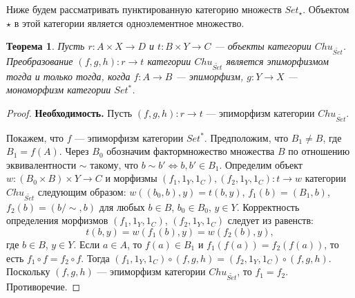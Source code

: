 \documentclass[a4paper,12pt]{article}
\newtheorem{theorem}{Теорема}
\begin{document}
Ниже будем рассматривать пунктированную категорию множеств $Set_\star$. Объектом $\star$ в этой категории является одноэлементное множество.
\begin{theorem}\label{epimorphism}
Пусть $r: A \times X \to D$ и $t: B \times Y \to C$ --- объекты категории $Chu_{\widetilde{Set}}$. Преобразование $(f,g,h): r \to t$ категории $Chu_{\widetilde{Set}}$ является эпиморфизмом тогда и только тогда, когда $f: A \to B$ --- эпиморфизм, $g: Y \to X$ --- мономорфизм категории $Set^*$.
\end{theorem}
\begin{proof}
    \textbf{Необходимость.} Пусть $(f,g,h): r \to t$ --- эпиморфизм категории $Chu_{\widetilde{Set}}$.

    Покажем, что $f$ --- эпиморфизм категории $Set^*$. Предположим, что $B_1 \ne B$, где $B_1 = f(A)$. Через $B_0$ обозначим фактормножество множества $B$ по отношению эквивалентности $\sim$ такому, что $b \sim b' \Leftrightarrow b, b' \in B_1$. Определим объект $w: (B_0 \times B) \times Y \to C$ и морфизмы $(f_1,1_Y,1_C), (f_2,1_Y,1_C): t \to w$ категории $Chu_{\widetilde{Set}}$ следующим образом: $w((b_0,b),y) = t(b,y)$, $f_1(b) = (B_1,b)$, $f_2(b) = (b/\sim,b)$ для любых $b \in B$, $b_0 \in B_0$, $y \in Y$. Корректность определения морфизмов $(f_1,1_Y,1_C)$, $(f_2,1_Y,1_C)$ следует из равенств:
    $$
        t(b,y) = w(f_1(b),y) = w(f_2(b),y),
    $$
    где $b \in B$, $y \in Y$. Если $a \in A$, то $f(a) \in B_1$ и $f_1(f(a)) = f_2(f(a))$, то есть $f_1 \circ f = f_2 \circ f$. Тогда $(f_1,1_Y,1_C) \circ (f,g,h) = (f_2,1_Y,1_C) \circ (f,g,h)$. Поскольку $(f,g,h)$ --- эпиморфизм категории $Chu_{\widetilde{Set}}$, то $f_1 = f_2$. Противоречие.

    

\end{proof}
\end{document}
